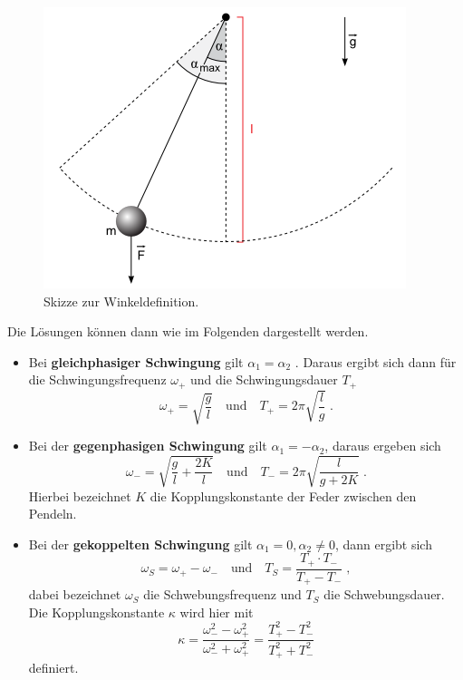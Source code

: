 \begin{figure}
  \includegraphics[width = \textwidth]{./logos/5222.png}
  \caption{Skizze zur Winkeldefinition.\cite{Skizze}}
  \label{fig:pendel}
\end{figure}

Die Lösungen können dann wie im Folgenden dargestellt werden.
\begin{itemize}
  \item Bei \textbf{gleichphasiger Schwingung} gilt $\alpha_1 = \alpha_2$ .
  Daraus ergibt sich dann für die Schwingungsfrequenz $\omega_+$
  und die Schwingungsdauer $T_+$
  \begin{equation}
  \omega_+ = \sqrt{\frac{g}{l}} \quad \text{und} \quad
  T_+ = 2\pi \sqrt{\frac{l}{g}}\;.
  \label{eqn:gls}
\end{equation}
\item Bei der \textbf{gegenphasigen Schwingung} gilt $\alpha_1 = - \alpha_2$,
daraus ergeben sich
\begin{equation}
   \omega_- = \sqrt{\frac{g}{l} + \frac{2K}{l}} \quad \text{und} \quad
   T_- = 2\pi \sqrt{\frac{l}{g+2K}}\;.
   \label{eqn:ggs}
 \end{equation}
 Hierbei bezeichnet $K$ die Kopplungskonstante der Feder zwischen den Pendeln.
 \item Bei der \textbf{gekoppelten Schwingung} gilt $\alpha_1 = 0, \alpha_2 \neq 0$,
 dann ergibt sich
 \begin{equation}
   \omega_S = \omega_+ - \omega_- \quad \text{und} \quad
   T_S = \frac{T_+\cdot T_-}{T_+ - T_-}\;,
   \label{eqn:gks}
 \end{equation}
 dabei bezeichnet $\omega_S$ die Schwebungsfrequenz und $T_S$ die Schwebungsdauer.
 Die Kopplungskonstante $\kappa$ wird hier mit
 \begin{equation}
   \kappa = \frac{\omega_- ^2 - \omega_+ ^2}{\omega_- ^2 + \omega_+ ^2}
   = \frac{T_+ ^2 - T_- ^2}{T_+ ^2 + T_- ^2}
   \label{eqn:K}
 \end{equation}
 definiert.

 \end{itemize}
